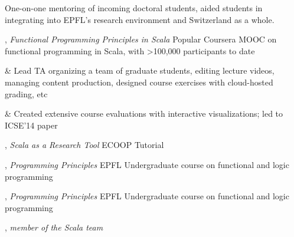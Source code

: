 \documentclass[9pt]{article}
\begin{document}
 
\newline\noindent One-on-one mentoring of incoming doctoral students, aided students in integrating into EPFL's research environment and Switzerland as a whole.


\pagebreak
\medskip
{}

, {\em Functional Programming Principles in Scala} 
\newline\noindent Popular Coursera MOOC on functional programming in Scala,
\newline\noindent with >100,000 participants to date
\vspace{0.05in}
\begin{easylist}[itemize]
& Lead TA organizing a team of graduate students, editing lecture videos, managing content production, designed course exercises with cloud-hosted grading, etc

& Created extensive course evaluations with interactive visualizations; led to ICSE'14 paper
\end{easylist}
\medskip

, {\em Scala as a Research Tool} 
\newline\noindent ECOOP Tutorial
\medskip

, {\em Programming Principles} 
\newline\noindent EPFL Undergraduate course on functional and logic programming
\medskip

, {\em Programming Principles} 
\newline\noindent EPFL Undergraduate course on functional and logic programming

\medskip

\medskip
{}

, {\em member of the Scala team} 
\end{document}

